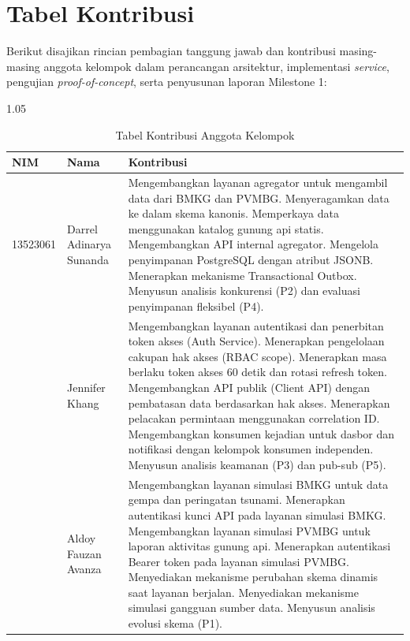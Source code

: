 \setcounter{page}{1}

\tableofcontents
\newpage

\listoftables
\vspace{0.8cm}
\begingroup
\let\clearpage\relax
\listoffigures
\endgroup
\newpage

\section*{Tabel Kontribusi}

Berikut disajikan rincian pembagian tanggung jawab dan kontribusi masing-masing anggota kelompok dalam perancangan arsitektur, implementasi \textit{service}, pengujian \textit{proof-of-concept}, serta penyusunan laporan Milestone 1:

\begin{table}[H]
\centering
\footnotesize
\begin{spacing}{1.05}
\caption{Tabel Kontribusi Anggota Kelompok}
\label{tab:kontribusi}
\begin{tabularx}{\textwidth}{l p{4.2cm} X}
\toprule
\textbf{NIM} & \textbf{Nama} & \textbf{Kontribusi} \\
\midrule
13523061 & Darrel Adinarya Sunanda & 
Mengembangkan layanan agregator untuk mengambil data dari BMKG dan PVMBG. Menyeragamkan data ke dalam skema kanonis. Memperkaya data menggunakan katalog gunung api statis. Mengembangkan API internal agregator. Mengelola penyimpanan PostgreSQL dengan atribut JSONB. Menerapkan mekanisme Transactional Outbox. Menyusun analisis konkurensi (P2) dan evaluasi penyimpanan fleksibel (P4). \\
\addlinespace
13524110 & Jennifer Khang & 
Mengembangkan layanan autentikasi dan penerbitan token akses (Auth Service). Menerapkan pengelolaan cakupan hak akses (RBAC scope). Menerapkan masa berlaku token akses 60 detik dan rotasi refresh token. Mengembangkan API publik (Client API) dengan pembatasan data berdasarkan hak akses. Menerapkan pelacakan permintaan menggunakan correlation ID. Mengembangkan konsumen kejadian untuk dasbor dan notifikasi dengan kelompok konsumen independen. Menyusun analisis keamanan (P3) dan pub-sub (P5). \\
\addlinespace
18223113 & Aldoy Fauzan Avanza & 
Mengembangkan layanan simulasi BMKG untuk data gempa dan peringatan tsunami. Menerapkan autentikasi kunci API pada layanan simulasi BMKG. Mengembangkan layanan simulasi PVMBG untuk laporan aktivitas gunung api. Menerapkan autentikasi Bearer token pada layanan simulasi PVMBG. Menyediakan mekanisme perubahan skema dinamis saat layanan berjalan. Menyediakan mekanisme simulasi gangguan sumber data. Menyusun analisis evolusi skema (P1). \\
\bottomrule
\end{tabularx}
\end{spacing}
\end{table}

\newpage
{}
\setcounter{page}{1}

